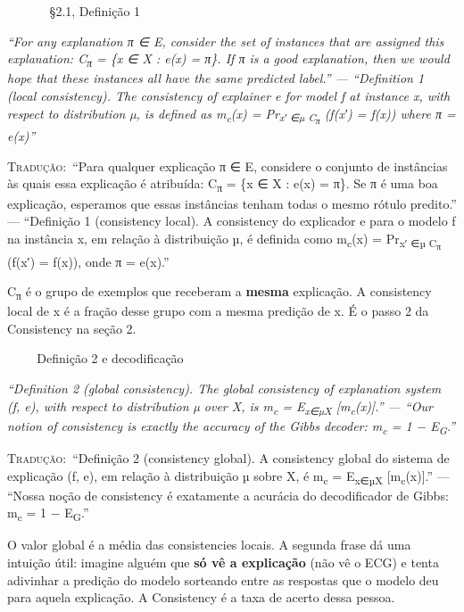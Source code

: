 \documentclass[11pt,a4paper]{article}
\newcommand{\metrictag}[2]{{\setlength{\fboxsep}{1.5pt}%
  \ifstrequal{#1}{c}{\colorbox{cC}{\textcolor{white}{\scriptsize\textbf{#2}}}}{%
  \ifstrequal{#1}{s}{\colorbox{cS}{\textcolor{white}{\scriptsize\textbf{#2}}}}{%
  \colorbox{black!60}{\textcolor{white}{\scriptsize\textbf{#2}}}}}}}
\newcommand{\pagechip}[1]{{\setlength{\fboxsep}{1.5pt}\colorbox{cAcc}{\textcolor{white}{\scriptsize\texttt{#1}}}}}
\newenvironment{origquote}{\par\itshape\small}{\par}
\newenvironment{tradquote}{\par\small\textsc{Tradução:}\ }{\par}
\newcommand{\explab}[1]{\par\smallskip{\small\color{cAcc}\textbf{\MakeUppercase{#1}}}\par}
\begin{document}
\begin{citacard}{\pagechip{p. 4–5} §2.1, Definição 1 \metrictag{c}{C}}
\begin{origquote}“For any explanation π ∈ E, consider the set of instances that are assigned this explanation: C\textsubscript{π} = \{x ∈ X : e(x) = π\}. If π is a good explanation, then we would hope that these instances all have the same predicted label.” — “Definition 1 (local consistency). The consistency of explainer e for model f at instance x, with respect to distribution µ, is defined as m\textsubscript{c}(x) = Pr\textsubscript{x′ ∈µ C\textsubscript{π}} (f(x′) = f(x)) where π = e(x)”\end{origquote}
\begin{tradquote}“Para qualquer explicação π ∈ E, considere o conjunto de instâncias às quais essa explicação é atribuída: C\textsubscript{π} = \{x ∈ X : e(x) = π\}. Se π é uma boa explicação, esperamos que essas instâncias tenham todas o mesmo rótulo predito.” — “Definição 1 (consistency local). A consistency do explicador e para o modelo f na instância x, em relação à distribuição µ, é definida como m\textsubscript{c}(x) = Pr\textsubscript{x′ ∈µ C\textsubscript{π}} (f(x′) = f(x)), onde π = e(x).”\end{tradquote}
\explab{Explicação}
C\textsubscript{π} é o grupo de exemplos que receberam a \textbf{mesma} explicação. A consistency local de x é a fração desse grupo com a mesma predição de x. É o passo 2 da Consistency na seção 2.
\end{citacard}

\begin{citacard}{\pagechip{p. 5} Definição 2 e decodificação \metrictag{c}{C}}
\begin{origquote}“Definition 2 (global consistency). The global consistency of explanation system (f, e), with respect to distribution µ over X, is m\textsubscript{c} = E\textsubscript{x∈µX} [m\textsubscript{c}(x)].” — “Our notion of consistency is exactly the accuracy of the Gibbs decoder: m\textsubscript{c} = 1 − E\textsubscript{G}.”\end{origquote}
\begin{tradquote}“Definição 2 (consistency global). A consistency global do sistema de explicação (f, e), em relação à distribuição µ sobre X, é m\textsubscript{c} = E\textsubscript{x∈µX} [m\textsubscript{c}(x)].” — “Nossa noção de consistency é exatamente a acurácia do decodificador de Gibbs: m\textsubscript{c} = 1 − E\textsubscript{G}.”\end{tradquote}
\explab{Explicação}
O valor global é a média das consistencies locais. A segunda frase dá uma intuição útil: imagine alguém que \textbf{só vê a explicação} (não vê o ECG) e tenta adivinhar a predição do modelo sorteando entre as respostas que o modelo deu para aquela explicação. A Consistency é a taxa de acerto dessa pessoa.
\end{citacard}
\end{document}
